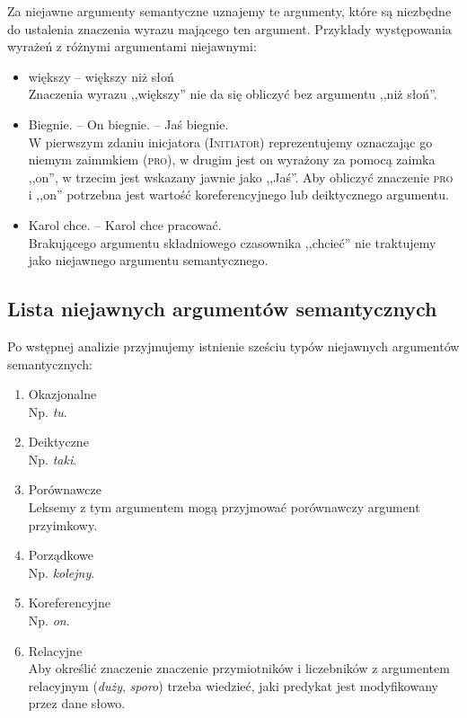 \documentclass[a4paper, 12pt]{article}
\theoremstyle{remark}
\begin{document}
Za niejawne argumenty semantyczne uznajemy te argumenty, które są niezbędne do ustalenia znaczenia wyrazu mającego ten argument.
Przykłady występowania wyrażeń z różnymi argumentami niejawnymi:
\begin{itemize}
	\item większy -- większy niż słoń \\ Znaczenia wyrazu ,,większy'' nie da się obliczyć bez argumentu ,,niż słoń''.
	\item Biegnie. -- On biegnie. -- Jaś biegnie. \\
	W pierwszym zdaniu inicjatora (\textsc{Initiator}) reprezentujemy oznaczając go niemym zaimmkiem (\textsc{pro}), w drugim jest on wyrażony za pomocą zaimka ,,on'', w trzecim jest wskazany jawnie jako ,,Jaś''.
	Aby obliczyć znaczenie \textsc{pro} i ,,on'' potrzebna jest wartość koreferencyjnego lub deiktycznego argumentu.
	\item Karol chce. -- Karol chce pracować.\\
	Brakującego argumentu składniowego czasownika ,,chcieć'' nie traktujemy jako niejawnego argumentu semantycznego.
\end{itemize}

\subsection{Lista niejawnych argumentów semantycznych} %
\label{niejawne}
Po wstępnej analizie przyjmujemy istnienie sześciu typów niejawnych argumentów semantycznych:

\begin{enumerate}
\item Okazjonalne \\ Np. \emph{tu}.
\item Deiktyczne\\ Np. \emph{taki}.
\item Porównawcze \\ Leksemy z tym argumentem mogą przyjmować porównawczy argument przyimkowy.
\item Porządkowe \\ Np. \emph{kolejny}.
\item Koreferencyjne \\ Np. \emph{on}.
\item Relacyjne \\ Aby określić znaczenie znaczenie przymiotników i liczebników z argumentem relacyjnym (\emph{duży}, \emph{sporo}) trzeba wiedzieć, jaki predykat jest modyfikowany przez dane słowo.
\label{relac}
\end{enumerate}
\end{document}
